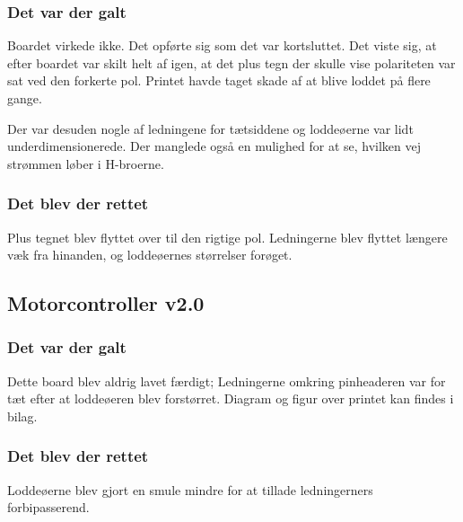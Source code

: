 \documentclass[a4paper,11pt,oneside,article,danish,table]{memoir}
\newcommand{\boarddate}[1]{\marginpar{\tiny\textcolor{blue!80!black}{#1}}}
\begin{document}
\subsubsection{Det var der galt}
Boardet virkede ikke. Det opførte sig som det var kortsluttet. Det viste sig, at efter boardet var skilt helt af igen, at det plus tegn der skulle vise polariteten var sat ved den forkerte pol. Printet havde taget skade af at blive loddet på flere gange.

Der var desuden nogle af ledningene for tætsiddene og loddeøerne var lidt underdimensionerede. Der manglede også en mulighed for at se, hvilken vej strømmen løber i H-broerne.
\subsubsection{Det blev der rettet}
Plus tegnet blev flyttet over til den rigtige pol. Ledningerne blev flyttet længere væk fra hinanden, og loddeøernes størrelser forøget.

\subsection{Motorcontroller v2.0}
\boarddate{8. marts 2012} 
\subsubsection{Det var der galt}
Dette board blev aldrig lavet færdigt; Ledningerne omkring pinheaderen var for tæt efter at loddeøeren blev forstørret. Diagram og figur over printet kan findes i bilag. 

\subsubsection{Det blev der rettet}
Loddeøerne blev gjort en smule mindre for at tillade ledningerners forbipasserend.
\end{document}
